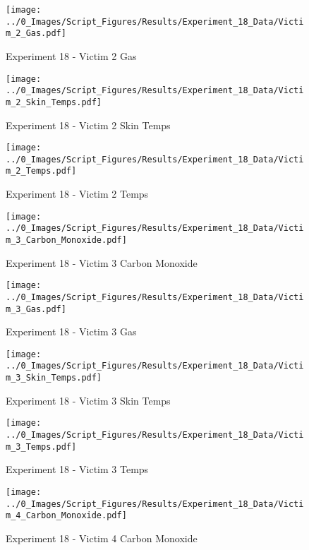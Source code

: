 	\begin{figure}[H]
		\centering
		\texttt{[image: ../0\_Images/Script\_Figures/Results/Experiment\_18\_Data/Victim\_2\_Gas.pdf]}
		\caption[]{Experiment 18 - Victim 2 Gas}
	\end{figure}
 
	\clearpage

	\begin{figure}[H]
		\centering
		\texttt{[image: ../0\_Images/Script\_Figures/Results/Experiment\_18\_Data/Victim\_2\_Skin\_Temps.pdf]}
		\caption[]{Experiment 18 - Victim 2 Skin Temps}
	\end{figure}
 

	\begin{figure}[H]
		\centering
		\texttt{[image: ../0\_Images/Script\_Figures/Results/Experiment\_18\_Data/Victim\_2\_Temps.pdf]}
		\caption[]{Experiment 18 - Victim 2 Temps}
	\end{figure}
 
	\clearpage

	\begin{figure}[H]
		\centering
		\texttt{[image: ../0\_Images/Script\_Figures/Results/Experiment\_18\_Data/Victim\_3\_Carbon\_Monoxide.pdf]}
		\caption[]{Experiment 18 - Victim 3 Carbon Monoxide}
	\end{figure}
 

	\begin{figure}[H]
		\centering
		\texttt{[image: ../0\_Images/Script\_Figures/Results/Experiment\_18\_Data/Victim\_3\_Gas.pdf]}
		\caption[]{Experiment 18 - Victim 3 Gas}
	\end{figure}
 
	\clearpage

	\begin{figure}[H]
		\centering
		\texttt{[image: ../0\_Images/Script\_Figures/Results/Experiment\_18\_Data/Victim\_3\_Skin\_Temps.pdf]}
		\caption[]{Experiment 18 - Victim 3 Skin Temps}
	\end{figure}
 

	\begin{figure}[H]
		\centering
		\texttt{[image: ../0\_Images/Script\_Figures/Results/Experiment\_18\_Data/Victim\_3\_Temps.pdf]}
		\caption[]{Experiment 18 - Victim 3 Temps}
	\end{figure}
 
	\clearpage

	\begin{figure}[H]
		\centering
		\texttt{[image: ../0\_Images/Script\_Figures/Results/Experiment\_18\_Data/Victim\_4\_Carbon\_Monoxide.pdf]}
		\caption[]{Experiment 18 - Victim 4 Carbon Monoxide}
	\end{figure}
 


